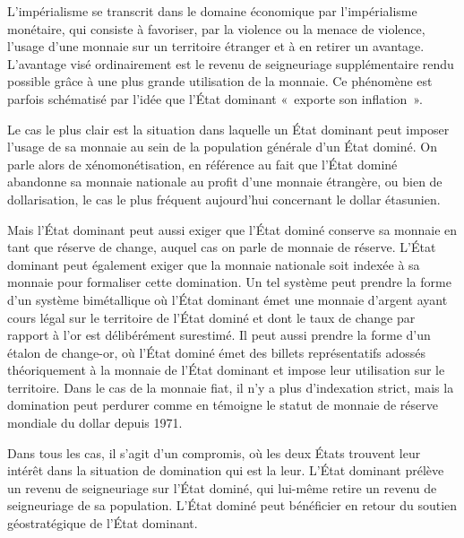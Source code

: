 L'impérialisme se transcrit dans le domaine économique par l'impérialisme monétaire, qui consiste à favoriser, par la violence ou la menace de violence, l'usage d'une monnaie sur un territoire étranger et à en retirer un avantage. L'avantage visé ordinairement est le revenu de seigneuriage supplémentaire rendu possible grâce à une plus grande utilisation de la monnaie. Ce phénomène est parfois schématisé par l'idée que l'État dominant «~exporte son inflation~».

Le cas le plus clair est la situation dans laquelle un État dominant peut imposer l'usage de sa monnaie au sein de la population générale d'un État dominé. On parle alors de xénomonétisation, en référence au fait que l'État dominé abandonne sa monnaie nationale au profit d'une monnaie étrangère, ou bien de dollarisation, le cas le plus fréquent aujourd'hui concernant le dollar étasunien.

Mais l'État dominant peut aussi exiger que l'État dominé conserve sa monnaie en tant que réserve de change, auquel cas on parle de monnaie de réserve. L'État dominant peut également exiger que la monnaie nationale soit indexée à sa monnaie pour formaliser cette domination. Un tel système peut prendre la forme d'un système bimétallique où l'État dominant émet une monnaie d'argent ayant cours légal sur le territoire de l'État dominé et dont le taux de change par rapport à l'or est délibérément surestimé. Il peut aussi prendre la forme d'un étalon de change-or, où l'État dominé émet des billets représentatifs adossés théoriquement à la monnaie de l'État dominant et impose leur utilisation sur le territoire. Dans le cas de la monnaie fiat, il n'y a plus d'indexation strict, mais la domination peut perdurer comme en témoigne le statut de monnaie de réserve mondiale du dollar depuis 1971.

Dans tous les cas, il s'agit d'un compromis, où les deux États trouvent leur intérêt dans la situation de domination qui est la leur. L'État dominant prélève un revenu de seigneuriage sur l'État dominé, qui lui-même retire un revenu de seigneuriage de sa population. L'État dominé peut bénéficier en retour du soutien géostratégique de l'État dominant.

